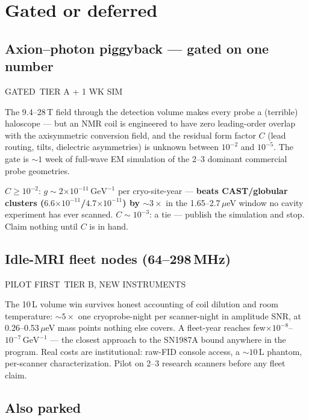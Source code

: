 \documentclass[11pt]{article}
\newcommand{\chip}[3]{\colorbox{#1}{\textcolor{#2}{\scriptsize\textsf{\vphantom{Ag}#3}}}}
\newcommand{\cfirst}[1]{\chip{gatesoft}{gateink}{#1}}
\newcommand{\ctier}[1]{\chip{numbg}{inkfaint}{#1}}
\newcommand{\ueV}{\ensuremath{\mu}eV}
\newcommand{\e}[1]{\ensuremath{\times10^{#1}}}
\begin{document}
\section{Gated or deferred}

\subsection{Axion--photon piggyback --- gated on one number}
\cfirst{GATED}\ \ctier{TIER A + 1 WK SIM}

\medskip\noindent
The 9.4--28\,T field through the detection volume makes every probe a (terrible)
haloscope --- but an NMR coil is engineered to have zero leading-order overlap
with the axisymmetric conversion field, and the residual form factor $C$ (lead
routing, tilts, dielectric asymmetries) is unknown between $10^{-2}$ and
$10^{-5}$. The gate is ${\sim}1$ week of full-wave EM simulation of the 2--3
dominant commercial probe geometries.

\begin{numbers}\small
$C\geq10^{-2}$: $g\sim2\e{-11}\,\mathrm{GeV}^{-1}$ per cryo-site-year ---
\textbf{beats CAST/globular clusters ($6.6\e{-11}$/$4.7\e{-11}$) by
${\sim}3\times$} in the 1.65--2.7\,\ueV{} window no cavity experiment has ever
scanned. $C\sim10^{-3}$: a tie --- publish the simulation and stop. Claim
nothing until $C$ is in hand.
\end{numbers}

\subsection{Idle-MRI fleet nodes (64--298\,MHz)}
\cfirst{PILOT FIRST}\ \ctier{TIER B, NEW INSTRUMENTS}

\medskip\noindent
The 10\,L volume win survives honest accounting of coil dilution and room
temperature: ${\sim}5\times$ one cryoprobe-night per scanner-night in amplitude
SNR, at 0.26--0.53\,\ueV{} mass points nothing else covers. A fleet-year reaches
few${}\e{-8}$--$10^{-7}\,\mathrm{GeV}^{-1}$ --- the closest approach to the
SN1987A bound anywhere in the program. Real costs are institutional: raw-FID
console access, a ${\sim}10$\,L phantom, per-scanner characterization. Pilot on
2--3 research scanners before any fleet claim.

\subsection{Also parked}
\end{document}
